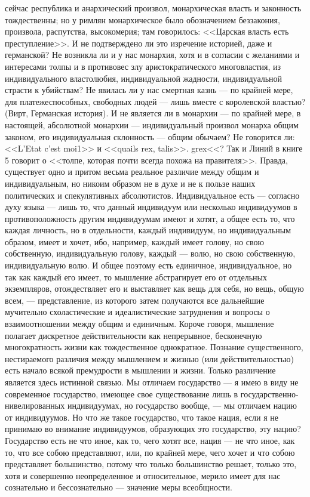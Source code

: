 \documentclass[12pt]{article}
\begin{document}
сейчас республика и анархический произвол, монархическая власть и законность тождественны; но у римлян монархическое было обозначением беззакония, произвола, распутства, высокомерия; там говорилось: <<Царская власть есть преступление>>. И не подтверждено ли это изречение историей, даже и германской? Не возникла ли и у нас монархия, хотя и в согласии с желаниями и интересами толпы и в противовес злу аристократического многовластия, из индивидуального властолюбия, индивидуальной жадности, индивидуальной страсти к убийствам? Не явилась ли у нас смертная казнь --- по крайней мере, для платежеспособных, свободных людей --- лишь вместе с королевской властью? (Вирт, Германская история). И не является ли в монархии --- по крайней мере, в настоящей, абсолютной монархии --- индивидуальный произвол монарха общим законом, его индивидуальная склонность --- общим обычаем? Не говорится ли: <<L'Etat c'est moi1>> и <<quails rex, talis>>. grex<<? Так и Линий в книге 5 говорит о <<толпе, которая почти всегда похожа на правителя>>. Правда, существует одно и притом весьма реальное различие между общим и индивидуальным, но никоим образом не в духе и не к пользе наших политических и спекулятивных абсолютистов. Индивидуальное есть --- согласно духу языка --- лишь то, что данный индивидуум или несколько индивидуумов в противоположность другим индивидуумам имеют и хотят, а общее есть то, что каждая личность, но в отдельности, каждый индивидуум, но индивидуальным образом, имеет и хочет, ибо, например, каждый имеет голову, но свою собственную, индивидуальную голову, каждый --- волю, но свою собственную, индивидуальную волю. И общее поэтому есть единичное, индивидуальное, но так как каждый его имеет, то мышление абстрагирует его от отдельных экземпляров, отождествляет его и выставляет как вещь для себя, но вещь, общую всем, --- представление, из которого затем получаются все дальнейшие мучительно схоластические и идеалистические затруднения и вопросы о взаимоотношении между общим и единичным. Короче говоря, мышление полагает дискретное действительности как непрерывное, бесконечную многократность жизни как тождественное однократное. Познание существенного, нестираемого различия между мышлением и жизнью (или действительностью) есть начало всякой премудрости в мышлении и жизни. Только различение является здесь истинной связью. Мы отличаем государство --- я имею в виду не современное государство, имеющее свое существование лишь в государственно-нивелированных индивидуумах, но государство вообще, --- мы отличаем нацию от индивидуумов. Но что же такое государство, что такое нация, если я не принимаю во внимание индивидуумов, образующих это государство, эту нацию? Государство есть не что иное, как то, чего хотят все, нация --- не что иное, как то, что все собою представляют, или, по крайней мере, чего хочет и что собою представляет большинство, потому что только большинство решает, только это, хотя и совершенно неопределенное и относительное, мерило имеет для нас сознательно и бессознательно --- значение меры всеобщности. 
\end{document}

